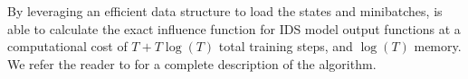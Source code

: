 \noindent By leveraging an efficient data structure to
load the states and minibatches,
\replay{} is able to calculate the exact influence function
for IDS model output functions at a computational cost of
$T + T\log(T)$ total training steps, and $\log(T)$ memory.
We refer the reader to \citet{engstrom2025optimizing} for a complete
description of the algorithm.









